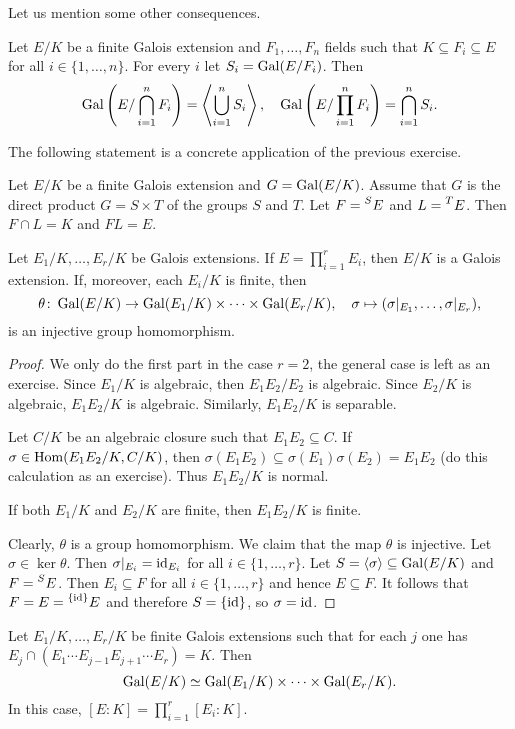 Let us mention some other consequences.

\begin{exercise}
    Let $E/K$ be a finite Galois extension 
    and $F_1,\dots,F_n$ fields 
    such that $K\subseteq F_i\subseteq E$ for 
    all $i\in\{1,\dots,n\}$. For every 
    $i$ let $S_i=\operatorname{Gal}(E/F_i)$. Then
    \[
    \operatorname{Gal}\left(E/\bigcap_{i=1}^nF_i\right)=\left\langle\bigcup_{i=1}^nS_i\right\rangle,
    \quad
    \operatorname{Gal}\left(E/\prod_{i=1}^nF_i\right)=\bigcap_{i=1}^nS_i.
    \]
\end{exercise}

The following statement is a concrete application of the 
previous exercise.

\begin{exercise}
    Let $E/K$ be a finite Galois extension and $G=\operatorname{Gal}(E/K)$.
    Assume that $G$ is the direct product
    $G=S\times T$
    of the groups $S$ and $T$. Let 
    $F=\prescript{S}{}{E}$ and
    $L=\prescript{T}{}{E}$. Then $F\cap L=K$ and $FL=E$.
\end{exercise}

\begin{proposition}
Let $E_1/K,\dots,E_r/K$ be Galois extensions. 
If $E=\prod_{i=1}^rE_i$, then $E/K$ is a Galois extension. If, moreover, each $E_i/K$ is finite,
then 
\[
\theta\colon \operatorname{Gal}(E/K)\to \operatorname{Gal}(E_1/K)\times\cdots\times\operatorname{Gal}(E_r/K),
\quad
\sigma\mapsto(\sigma|_{E_1},\dots,\sigma|_{E_r}),
\]
is an injective group homomorphism.
\end{proposition}

\begin{proof}
    We only do the first part in the case $r=2$, the general case is left as an exercise. Since $E_1/K$ is algebraic, 
    then $E_1E_2/E_2$ is algebraic. Since $E_2/K$ is algebraic, $E_1E_2/K$ is algebraic. Similarly, 
    $E_1E_2/K$ is separable. 
    
    Let $C/K$ be an algebraic closure such that $E_1E_2\subseteq C$. If $\sigma\in\operatorname{Hom}(E_1E_2/K,C/K)$, then 
    $\sigma(E_1E_2)\subseteq\sigma(E_1)\sigma(E_2)=E_1E_2$ (do this calculation as an exercise). 
    Thus $E_1E_2/K$ is normal. 
    
    If both $E_1/K$ and $E_2/K$ are finite, then $E_1E_2/K$ is finite. 
    
    Clearly, $\theta$ is a group homomorphism. We claim that the map $\theta$ is injective. Let $\sigma\in\ker\theta$. Then
    $\sigma|_{E_i}=\operatorname{id}_{E_i}$ for all $i\in\{1,\dots,r\}$. Let $S=\langle\sigma\rangle\subseteq\operatorname{Gal}(E/K)$ and
    $F=\prescript{S}{}{E}$. Then $E_i\subseteq F$ for all $i\in\{1,\dots,r\}$ and
    hence $E\subseteq F$. It follows that $F=E=\prescript{\{\operatorname{id}\}}{}{E}$ and therefore $S=\{\operatorname{id}\}$, so 
    $\sigma=\operatorname{id}$. 
\end{proof}

\begin{exercise}
    Let $E_1/K,\dots,E_r/K$ be finite Galois extensions such that for each $j$ 
    one has $E_j\cap (E_1\cdots E_{j-1}E_{j+1}\cdots E_r)=K$. Then 
    \[
    \operatorname{Gal}(E/K)\simeq\operatorname{Gal}(E_1/K)\times\cdots\times\operatorname{Gal}(E_r/K).
    \]
    In this case, $[E:K]=\prod_{i=1}^r[E_i:K]$. 
\end{exercise}

